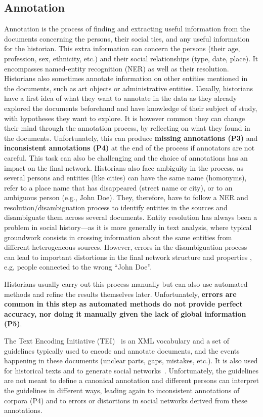 \subsection{Annotation}
Annotation is the process of finding and extracting useful information from the documents concerning the persons, their social ties, and any useful information for the historian.
This extra information can concern the persons (their age, profession, sex, ethnicity, etc.) and their social relationships (type, date, place).
It encompasses named-entity recognition (NER) as well as their resolution.
Historians also sometimes annotate information on other entities mentioned in the documents, such as art objects or administrative entities.
Usually, historians have a first idea of what they want to annotate in the data as they already explored the documents beforehand and have knowledge of their subject of study, with hypotheses they want to explore.
It is however common they can change their mind through the annotation process, by reflecting on what they found in the documents.
Unfortunately, this can produce \textbf{missing annotations (P3)} and \textbf{inconsistent annotations (P4)} at the end of the process if annotators are not careful.
This task can also be challenging and the choice of annotations has an impact on the final network.
Historians also face ambiguity in the process, as several persons and entities (like cities) can have the same name (homonyms), refer to a place name that has disappeared (street name or city), or to an ambiguous person (e.g., John Doe).
They, therefore, have to follow a NER and resolution/disambiguation process to identify entities in the sources and disambiguate them across several documents.
Entity resolution has always been a problem in social history---as it is more generally in text analysis, where typical groundwork consists in crossing information about the same entities from different heterogeneous sources.
However, errors in the disambiguation process can lead to important distortions in the final network structure and properties \cite{diesnerImpactEntityDisambiguation2015}, e.g, people connected to the wrong ``John Doe''.

Historians usually carry out this process manually but can also use automated methods and refine the results themselves later.
Unfortunately, \textbf{errors are common in this step as automated methods do not provide perfect accuracy, nor doing it manually given the lack of global information (P5)}.

The Text Encoding Initiative (TEI)~\cite{TEI} is an XML vocabulary and a set of guidelines typically used to encode and annotate documents, and the events happening in these documents (unclear parts, gaps, mistakes, etc.).
It is also used for historical texts and to generate social networks~\cite{dufournaudComparaisonOutilsPour2006, vistorian_mini_questionnaires}.
Unfortunately, the guidelines are not meant to define a canonical annotation and different persons can interpret the guidelines in different ways, leading again to inconsistent annotations of corpora (P4) and to errors or distortions in social networks derived from these annotations.


